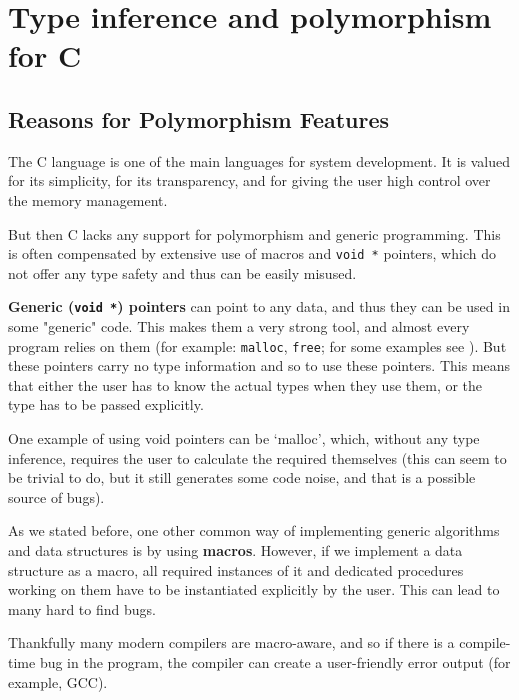 \chapter{Type inference and polymorphism for C}
\label{chap:infPolyC}
\newcommand{\lambdac}[1]{\ensuremath{{\llbracket #1 \rrbracket}_{\lambda_C}}}

\section{Reasons for Polymorphism Features}

The C language is one of the main languages for system development. It is valued for its simplicity, for its transparency, and for giving the user high control over the memory management.

But then C lacks any support for polymorphism and generic programming. This is often compensated by extensive use of macros and \lstinline{void *} pointers, which do not offer any type safety and thus can be easily misused.

\textbf{Generic (\lstinline{void *}) pointers} can point to any data, and thus they can be used in some "generic" code. This makes them a very strong tool, and almost every program relies on them (for example: \lstinline{malloc}, \lstinline{free}; for some examples see \cite{organisation1999iso}). But these pointers carry no type information and so to use these pointers. This means that either the user has to know the actual types when they use them, or the type has to be passed explicitly.

One example of using void pointers can be `malloc', which, without any type inference, requires the user to calculate the required themselves (this can seem to be trivial to do, but it still generates some code noise, and that is a possible source of bugs).

As we stated before, one other common way of implementing generic algorithms and data structures is by using \textbf{macros}. However, if we implement a data structure as a macro, all required instances of it and dedicated procedures working on them have to be instantiated explicitly by the user. This can lead to many hard to find bugs.

Thankfully many modern compilers are macro-aware, and so if there is a compile-time bug in the program, the compiler can create a user-friendly error output (for example, GCC). %


